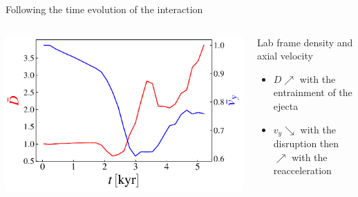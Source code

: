 \begin{frame}{Following the time evolution of the interaction}
\begin{columns}
\begin{column}{.5\textwidth}
      \includegraphics[width=\linewidth]{images/evolution_integrated_xz_d_vy_2_riot.pdf}
	   \end{column}
	   \begin{column}{.5\textwidth}
		{\footnotesize
		\begin{block}{Lab frame density and axial velocity}
			\begin{itemize}
				\item $D \nearrow$ with the entrainment of the ejecta
				\item $v_y \searrow$ with the disruption then $\nearrow$ with the reacceleration
			\end{itemize}
		\end{block}}
	   \end{column}
	\end{columns}
\end{frame}
